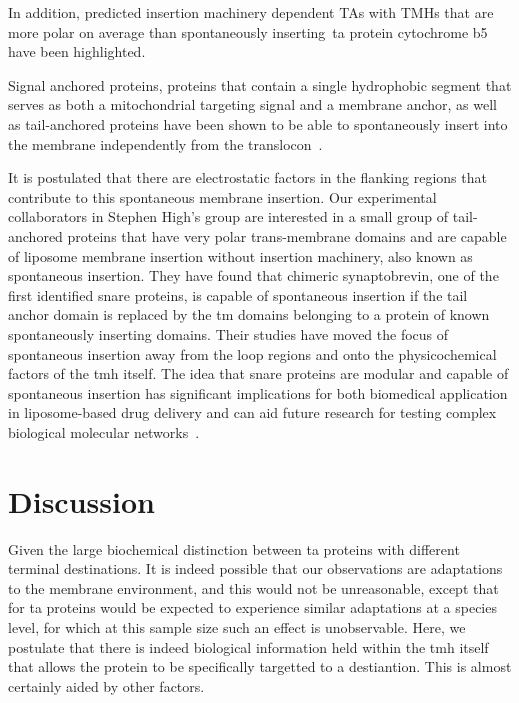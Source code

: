 In addition, predicted insertion machinery dependent TAs with TMHs that are more polar on average than spontaneously inserting~\gls{ta} protein cytochrome b5 have been highlighted.

Signal anchored proteins, proteins that contain a single hydrophobic segment that serves as both a mitochondrial targeting signal and a membrane anchor, as well as tail-anchored proteins have been shown to be able to spontaneously insert into the membrane independently from the translocon~\cite{Elisa2012, Lan2000, Colombo2009}.

It is postulated that there are electrostatic factors in the flanking regions that contribute to this spontaneous membrane insertion.
Our experimental collaborators in Stephen High’s group are interested in a small group of tail-anchored proteins that have very polar trans-membrane domains and are capable of liposome membrane insertion without insertion machinery, also known as spontaneous insertion.
They have found that chimeric synaptobrevin, one of the first identified \gls{snare} proteins, is capable of spontaneous insertion if the tail anchor domain is replaced by the \gls{tm} domains belonging to a protein of known spontaneously inserting domains.
Their studies have moved the focus of spontaneous insertion away from the loop regions and onto the physicochemical factors of the \gls{tmh} itself.
The idea that \gls{snare} proteins are modular and capable of spontaneous insertion has significant implications for both biomedical application in liposome-based drug delivery and can aid future research for testing complex biological molecular networks~\cite{Allen2013, Nordlund2014}.

\section{Discussion}

Given the large biochemical distinction between \gls{ta} proteins with different terminal destinations.
It is indeed possible that our observations are adaptations to the membrane environment, and this would not be unreasonable, except that for \gls{ta} proteins would be expected to experience similar adaptations at a species level, for which at this sample size such an effect is unobservable.
Here, we postulate that there is indeed biological information held within the \gls{tmh} itself that allows the protein to be specifically targetted to a destiantion.
This is almost certainly aided by other factors.


